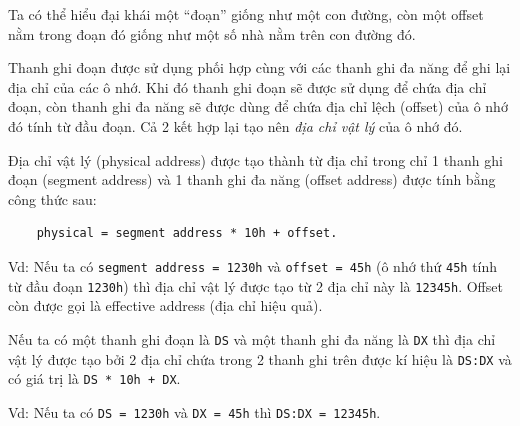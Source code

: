 \documentclass[12pt]{report}
\newcommand{\code}[1]{\texttt{#1}}
\begin{document}
Ta có thể hiểu đại khái một ``đoạn'' giống như một con đường, còn một offset nằm trong đoạn đó giống như một số nhà nằm trên con đường đó.

Thanh ghi đoạn được sử dụng phối hợp cùng với các thanh ghi đa năng để ghi lại địa chỉ của các ô nhớ. Khi đó thanh ghi đoạn sẽ được sử dụng để chứa địa chỉ đoạn, còn thanh ghi đa năng sẽ được dùng để chứa địa chỉ lệch (offset) của ô nhớ đó tính từ đầu đoạn. Cả 2 kết hợp lại tạo nên \textit{địa chỉ vật lý} của ô nhớ đó.

\begin{figure}[H]
    \centering
\end{figure}

Địa chỉ vật lý (physical address) được tạo thành từ địa chỉ trong chỉ 1 thanh ghi đoạn (segment address) và 1 thanh ghi đa năng (offset address) được tính bằng công thức sau:

\begin{center}
\begin{verbatim}
    physical = segment address * 10h + offset.
\end{verbatim}
\end{center}

Vd: Nếu ta có \code{segment address = 1230h} và \code{offset = 45h} (ô nhớ thứ \code{45h} tính từ đầu đoạn \code{1230h}) thì địa chỉ vật lý được tạo từ 2 địa chỉ này là \code{12345h}. Offset còn được gọi là effective address (địa chỉ hiệu quả).\bigskip

Nếu ta có một thanh ghi đoạn là \code{DS} và một thanh ghi đa năng là \code{DX} thì địa chỉ vật lý được tạo bởi 2 địa chỉ chứa trong 2 thanh ghi trên được kí hiệu là \code{DS:DX} và có giá trị là \code{DS * 10h + DX}. 

Vd: Nếu ta có \code{DS = 1230h} và \code{DX = 45h} thì \code{DS:DX = 12345h}.\bigskip
\end{document}
